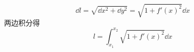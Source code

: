 

\begin{equation}
\dd{l} = \sqrt{\dd{x}^2 + \dd{y}^2} = \sqrt{1 + f'(x)^2} \dd{x}
\end{equation}
两边积分得
\begin{equation}
l = \int_{x_1}^{x_2} \sqrt{1 + f'(x)^2} \dd{x}
\end{equation}
